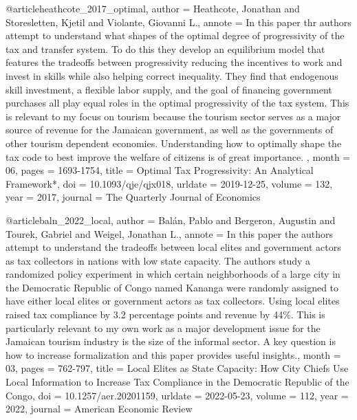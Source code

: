 @article{heathcote_2017_optimal,
	author = {Heathcote, Jonathan and Storesletten, Kjetil and Violante, Giovanni L.},
	annote = {In this paper thr authors attempt to understand what shapes of the optimal degree of progressivity of the tax and transfer system. To do this they develop an equilibrium model that features the tradeoffs between progressivity reducing the incentives to work and invest in skills while also helping correct inequality. They find that endogenous skill investment, a flexible labor supply, and the goal of financing government purchases all play equal roles in the optimal progressivity of the tax system. This is relevant to my focus on tourism because the tourism sector serves as a major source of revenue for the Jamaican government, as well as the governments of other tourism dependent economies. Understanding how to optimally shape the tax code to best improve the welfare of citizens is of great importance. },
	month = {06},
	pages = {1693-1754},
	title = {Optimal Tax Progressivity: An Analytical Framework*},
	doi = {10.1093/qje/qjx018},
	urldate = {2019-12-25},
	volume = {132},
	year = {2017},
	journal = {The Quarterly Journal of Economics}
}

@article{baln_2022_local,
	author = {Balán, Pablo and Bergeron, Augustin and Tourek, Gabriel and Weigel, Jonathan L.},
	annote = {In this paper the authors attempt to understand the tradeoffs between local elites and government actors as tax collectors in nations with low state capacity. The authors study a randomized policy experiment in which certain neighborhoods of a large city in the Democratic Republic of Congo named Kananga were randomly assigned to have either local elites or government actors as tax collectors. Using local elites raised tax compliance by 3.2 percentage points and revenue by 44\%. This is particularly relevant to my own work as a major development issue for the Jamaican tourism industry is the size of the informal sector. A key question is how to increase formalization and this paper provides useful insights.},
	month = {03},
	pages = {762-797},
	title = {Local Elites as State Capacity: How City Chiefs Use Local Information to Increase Tax Compliance in the Democratic Republic of the Congo},
	doi = {10.1257/aer.20201159},
	urldate = {2022-05-23},
	volume = {112},
	year = {2022},
	journal = {American Economic Review}
}

